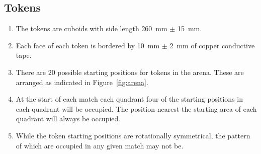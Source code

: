 \subsection{Tokens}
\label{spec:tokens}

\begin{enumerate}
  \item The tokens are cuboids with side length \SI{260}{mm} $\pm$ \SI{15}{mm}.
  \item Each face of each token is bordered by \SI{10}{mm} $\pm$ \SI{2}{mm} of
        copper conductive tape.
  \item There are 20 possible starting positions for tokens in the arena. These
        are arranged as indicated in Figure~\ref{fig:arena}.
  \item At the start of each match each quadrant four of the starting positions
        in each quadrant will be occupied. The position nearest the starting
        area of each quadrant will always be occupied.
  \item While the token starting positions are rotationally symmetrical, the
        pattern of which are occupied in any given match may not be.
\end{enumerate}
